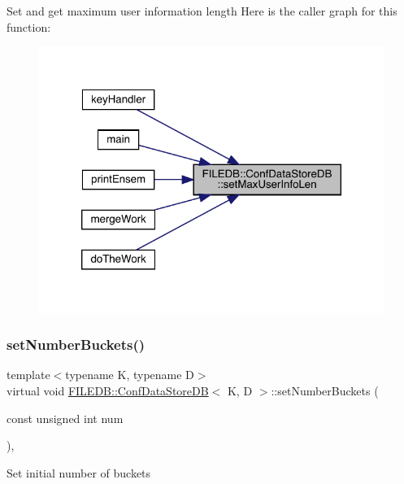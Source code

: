 Set and get maximum user information length Here is the caller graph for this function\+:\nopagebreak
\begin{figure}[H]
\begin{center}
\leavevmode
\includegraphics[width=320pt]{d8/d19/classFILEDB_1_1ConfDataStoreDB_a02a2fcc79ba97c11b4ec1ec0321e5415_icgraph}
\end{center}
\end{figure}
\mbox{\label{classFILEDB_1_1ConfDataStoreDB_a20a5d092cdcfbca4dbce15b2da006065}} 
\subsubsection{\texorpdfstring{setNumberBuckets()}{setNumberBuckets()}\hspace{0.1cm}{\footnotesize\ttfamily [1/2]}}
{\footnotesize\ttfamily template$<$typename K, typename D$>$ \\
virtual void \mbox{\hyperlink{classFILEDB_1_1ConfDataStoreDB}{F\+I\+L\+E\+D\+B\+::\+Conf\+Data\+Store\+DB}}$<$ K, D $>$\+::set\+Number\+Buckets (\begin{DoxyParamCaption}\item[{const unsigned int}]{num }\end{DoxyParamCaption})\hspace{0.3cm}{\ttfamily [inline]}, {\ttfamily [virtual]}}

Set initial number of buckets

